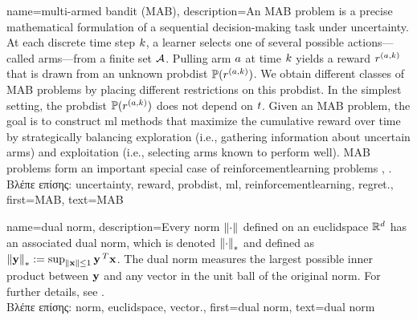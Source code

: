 {name={multi-armed bandit (MAB)},
	description={An MAB  problem is a precise mathematical 
		formulation of a sequential decision-making task under \gls{uncertainty}. At each 
		discrete time step $k$, a learner selects one of several possible 
		actions—called arms—from a finite set $\mathcal{A}$. Pulling arm $a$ at time 
		$k$ yields a \gls{reward} $r^{(a,k)}$ that is drawn from an unknown 
		\gls{probdist} $\mathbb{P}({r^{(a,k)}})$. We obtain different classes 
		of MAB problems by placing different restrictions on this \gls{probdist}. In the simplest 
		setting, the \gls{probdist} $\mathbb{P}({r^{(a,k)}})$ does not depend on $t$. 
		Given an MAB problem, the goal is to construct \gls{ml} methods that maximize the cumulative 
		\gls{reward} over time by strategically balancing exploration (i.e., gathering information 
		about uncertain arms) and exploitation (i.e., selecting arms known to perform well). 
		MAB problems form an important special case of \gls{reinforcementlearning} problems \cite{Bubeck2012}, \cite{SuttonEd2}. \\
		\foreignlanguage{greek}{Βλέπε επίσης:} \gls{uncertainty}, \gls{reward}, \gls{probdist}, \gls{ml}, \gls{reinforcementlearning}, \gls{regret}.},
	first={MAB},
	text={MAB}
}

{name={dual norm},
	description={Every \gls{norm} $\left\Vert {\cdot} \right\Vert_{}$ defined on an \gls{euclidspace} $\mathbb{R}^{d}$ 
		has an associated dual \gls{norm}, which is denoted $\left\Vert {\cdot} \right\Vert_{*}$ and defined as 
		$\left\Vert {{\bf y}} \right\Vert_{*} := \sup_{\Vert {{\bf x}} \Vert{} \le 1} {\bf y}\,^{T} {\bf x}$. 
		The dual \gls{norm} measures the largest possible inner product between ${\bf y}$ 
		and any \gls{vector} in the unit ball of the original \gls{norm}. For further details, see 
		\cite[Sec.~A.1.6]{BoydConvexBook}.\\
		\foreignlanguage{greek}{Βλέπε επίσης:} \gls{norm}, \gls{euclidspace}, \gls{vector}.},
	first={dual norm},
	text={dual norm}
}

